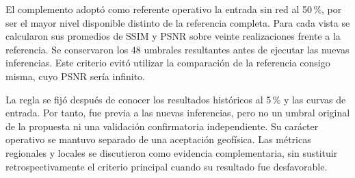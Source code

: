 El complemento adoptó como referente operativo la entrada sin red al 50\,\%, por ser el mayor nivel disponible distinto de la referencia completa. Para cada vista se calcularon sus promedios de SSIM y PSNR sobre veinte realizaciones frente a la referencia. Se conservaron los 48 umbrales resultantes antes de ejecutar las nuevas inferencias. Este criterio evitó utilizar la comparación de la referencia consigo misma, cuyo PSNR sería infinito.

La regla se fijó después de conocer los resultados históricos al 5\,\% y las curvas de entrada. Por tanto, fue previa a las nuevas inferencias, pero no un umbral original de la propuesta ni una validación confirmatoria independiente. Su carácter operativo se mantuvo separado de una aceptación geofísica. Las métricas regionales y locales se discutieron como evidencia complementaria, sin sustituir retrospectivamente el criterio principal cuando su resultado fue desfavorable.

